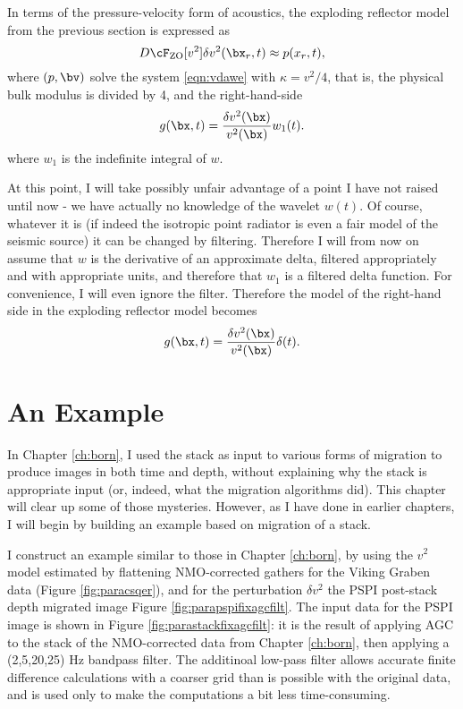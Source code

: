 In terms of the pressure-velocity form of acoustics, the exploding reflector model from the previous section is expressed as
\[
D\cF_{\rm ZO}[v^2]\delta v^2(\bx_r,t) \approx p(x_r,t),
\]
where $(p,\bv)$ solve the system \ref{eqn:vdawe} with $\kappa= v^2/4$, that is, the physical bulk modulus is divided by 4, and the right-hand-side
\begin{equation}
\label{eqn:explrefderiv}
g(\bx,t) = \frac{\delta v^2(\bx)}{v^2(\bx)}w_1(t). 
\end{equation}
where $w_1$ is the indefinite integral of $w$.

At this point, I will take possibly unfair advantage of a point I have not raised until now - we have actually no knowledge of the wavelet $w(t)$. Of course, whatever it is (if indeed the isotropic point radiator is even a fair model of the seismic source) it can be changed by filtering. Therefore I will from now on assume that $w$ is the derivative of an approximate delta, filtered appropriately and with appropriate units, and therefore that $w_1$ is a filtered delta function. For convenience, I will even ignore the filter. Therefore the model of the right-hand side in the exploding reflector model becomes
\begin{equation}
\label{eqn:explrefdelta}
g(\bx,t) = \frac{\delta v^2(\bx)}{v^2(\bx)}\delta(t). 
\end{equation}

\section{An Example}

In Chapter \ref{ch:born}, I used the stack as input to various forms of migration to produce images in both time and depth, without explaining why the stack is appropriate input (or, indeed, what the migration algorithms did). This chapter will clear up some of those mysteries. However, as I have done in earlier chapters, I will begin by building an example based on migration of a stack.

I construct an example similar to those in Chapter \ref{ch:born}, by using the $v^2$ model estimated by flattening NMO-corrected gathers for the Viking Graben data (Figure \ref{fig:paracsqer}), and for the perturbation $\delta v^2$ the PSPI post-stack depth migrated image Figure \ref{fig:parapspifixagcfilt}. The input data for the PSPI image is shown in Figure \ref{fig:parastackfixagcfilt}: it is the result of applying AGC to the stack of the NMO-corrected data from Chapter \ref{ch:born}, then applying a (2,5,20,25) Hz bandpass filter. The additinoal low-pass filter allows accurate finite difference calculations with a coarser grid than is possible with the original data, and is used only to make the computations a bit less time-consuming.  

